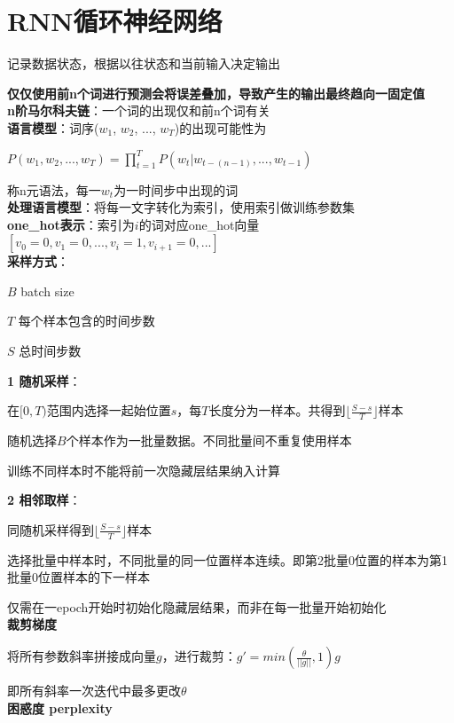 \documentclass[UTF8]{ctexart}
\begin{document}
\section{RNN循环神经网络}

\noindent 记录数据状态，根据以往状态和当前输入决定输出

  \textbf{仅仅使用前n个词进行预测会将误差叠加，导致产生的输出最终趋向一固定值}\\
\textbf{n阶马尔科夫链}：一个词的出现仅和前n个词有关\\
\textbf{语言模型}：词序($w_1$, $w_2$, ..., $w_T$)的出现可能性为

  $P(w_1, w_2,...,w_T) = \prod_{t=1}^{T} P(w_t|w_{t-(n-1)},...,w_{t-1})$

  称n元语法，每一$w_t$为一时间步中出现的词\\
\textbf{处理语言模型}：将每一文字转化为索引，使用索引做训练参数集\\
\textbf{one\_hot表示}：索引为$i$的词对应one\_hot向量$[v_0 = 0, v_1 = 0, ..., v_i = 1, v_{i+1} = 0, ...]$\\
\textbf{采样方式}：

  $B$ batch size
  
  $T$ 每个样本包含的时间步数

  $S$ 总时间步数

  \textbf{1 随机采样}：

  \quad 在$[0, T)$范围内选择一起始位置$s$，每$T$长度分为一样本。共得到$\lfloor \frac{S - s}{T} \rfloor$样本

  \quad 随机选择$B$个样本作为一批量数据。不同批量间不重复使用样本

  \quad 训练不同样本时不能将前一次隐藏层结果纳入计算
  
  \textbf{2 相邻取样}：

  \quad 同随机采样得到$\lfloor \frac{S - s}{T} \rfloor$样本

  \quad 选择批量中样本时，不同批量的同一位置样本连续。即第2批量0位置的样本为第1批量0位置样本的下一样本

  \quad 仅需在一epoch开始时初始化隐藏层结果，而非在每一批量开始初始化\\
\textbf{裁剪梯度}

  将所有参数斜率拼接成向量$g$，进行裁剪：$g' = min(\frac{\theta}{||g||}, 1)g$
  
  \quad 即所有斜率一次迭代中最多更改$\theta$\\
\textbf{困惑度 perplexity}
\end{document}
